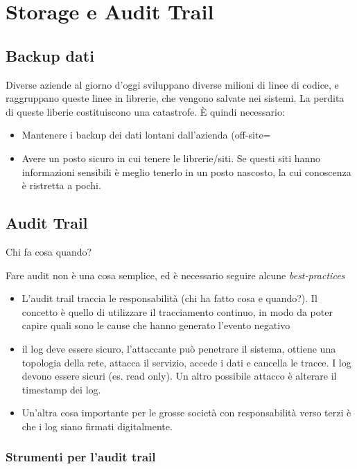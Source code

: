 \section{Storage e Audit Trail}
\label{sat}

\subsection{Backup dati}

Diverse aziende al giorno d'oggi sviluppano diverse milioni di linee di codice, 
e raggruppano queste linee in librerie, che vengono salvate nei sistemi. La 
perdita di queste liberie costituiscono una catastrofe. È quindi necessario:
\begin{itemize}
 \item Mantenere i backup dei dati lontani dall'azienda (off-site=
 \item Avere un posto sicuro in cui tenere le librerie/siti. Se questi siti 
 hanno informazioni sensibili è meglio tenerlo in un posto nascosto, la cui 
 conoscenza è ristretta a pochi.
\end{itemize}

\subsection{Audit Trail}

Chi fa cosa quando?

Fare audit non è una cosa semplice, ed è necessario seguire alcune 
\textit{best-practices}

\begin{itemize}
 \item L'audit trail traccia le responsabilità (chi ha fatto cosa e quando?). 
 Il concetto è quello di utilizzare il tracciamento continuo, in modo da poter 
 capire quali sono le cause che hanno generato l'evento negativo
 \item il log deve essere sicuro, l'attaccante può penetrare il sistema, 
 ottiene una topologia della rete, attacca il servizio, accede i dati e 
 cancella le tracce. I log devono essere sicuri (es. read only). Un altro 
 possibile attacco è alterare il timestamp dei log.
 \item Un'altra cosa importante per le grosse società con responsabilità verso 
 terzi è che i log siano firmati digitalmente.

\end{itemize}

\subsubsection{Strumenti per l'audit trail}

